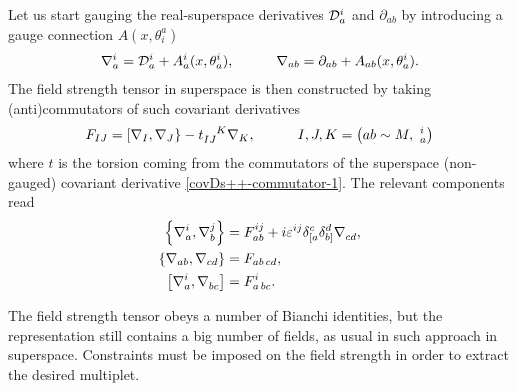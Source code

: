 Let us start gauging the real-superspace derivatives ${ \mathcal{D} }_{a}^i$ and $\partial_{ab}$ by introducing a gauge connection $A(x,\theta^a_i)$
\begin{align}
{ \mathcal{\nabla} }^i_a = { \mathcal{D} }_{a}^i + A_{a}^i(x,\theta^i_a),
\qquad\quad
{ \mathcal{\nabla} }_{ab} = \partial_{ab} + A_{ab}(x,\theta^i_a).
\end{align}
The field strength tensor in superspace is then constructed by taking (anti)commutators of such covariant derivatives
\begin{equation}
F_{IJ} = \left[ \covD_I, \covD_J \right\} - t\indices{_I_J^K} \covD_K,
\hspace{3em}
I,J,K = \left( ab \sim M,\ ^i_a \right)
\end{equation}
where $t$ is the  torsion coming from the commutators of the superspace (non-gauged) covariant derivative \eqref{covDs++-commutator-1}. The relevant components read
\begin{align}
\label{6d-gauge-F-with-torsion}
\left\{ { \mathcal{\nabla} }^i_a , { \mathcal{\nabla} }^j_b  \right\}
	& =
F^{ij}_{ab} 
+ i \varepsilon^{ij} 
	\delta^c_{[a} \delta^d_{b]} { \mathcal{\nabla} }^{}_{cd},
\\
\left\{ { \mathcal{\nabla} }_{ab}  , { \mathcal{\nabla} }_{cd}   \right\}
	& =
F_{ a b \, c d },
\\
\left[ { \mathcal{\nabla} }^i_a   ,  { \mathcal{\nabla} }^{}_{ b c } \right]
	& =
F^i_{ a \, b c }.
\end{align}

The field strength tensor obeys a number of Bianchi identities, but the representation still contains a big number of fields, as usual in such approach in superspace. Constraints must be imposed on the field strength in order to extract the desired multiplet.

